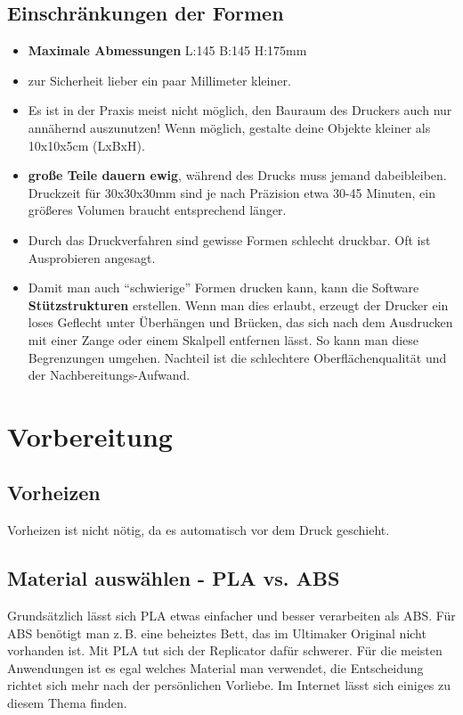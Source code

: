 \documentclass{\basedir/fablab-document}
\begin{document}
	\subsection{Einschränkungen der Formen}
	\begin{itemize}
			\item \textbf{Maximale Abmessungen}  L:145 B:145 H:175mm
			\item zur Sicherheit lieber ein paar Millimeter kleiner.
			\item Es ist in der Praxis meist nicht möglich, den Bauraum des Druckers auch nur annähernd auszunutzen! Wenn möglich, gestalte deine Objekte kleiner als 10x10x5cm (LxBxH).
		\item \textbf{große Teile dauern ewig}, während des Drucks muss jemand dabeibleiben. Druckzeit für 30x30x30mm sind je
		nach Präzision etwa 30-45 Minuten, ein größeres Volumen braucht entsprechend länger.
		\item Durch das Druckverfahren sind gewisse Formen schlecht druckbar. Oft ist Ausprobieren angesagt.
		\item Damit man auch \enquote{schwierige} Formen drucken kann, kann die Software \textbf{Stützstrukturen} erstellen. Wenn man dies erlaubt,
		erzeugt der Drucker ein loses Geflecht unter Überhängen und Brücken,
		das sich nach dem Ausdrucken mit einer Zange oder einem Skalpell entfernen lässt. So kann
		man diese Begrenzungen umgehen. Nachteil ist die schlechtere
		Oberflächenqualität und der Nachbereitungs-Aufwand.
	\end{itemize}
	\newpage
	
	
	\section{Vorbereitung}
	
	\subsection{Vorheizen}
	Vorheizen ist nicht nötig, da es automatisch vor dem Druck geschieht.
	
	\subsection{Material auswählen - PLA vs. ABS}
	Grundsätzlich lässt sich PLA etwas einfacher und besser verarbeiten als ABS. Für ABS benötigt man z.\,B. eine beheiztes
	Bett, das im Ultimaker Original nicht vorhanden ist. Mit PLA tut sich der Replicator dafür schwerer. Für die meisten
	Anwendungen ist es egal welches Material man verwendet, die Entscheidung richtet sich mehr nach der persönlichen
	Vorliebe. Im Internet lässt sich einiges zu diesem Thema finden.
	
\end{document}
